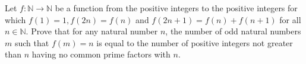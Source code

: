 Let $ f: \mathbb{N} \rightarrow \mathbb{N} $ be a function from the positive integers to the positive integers for which $ f(1)=1,f(2n)=f(n) $ and $ f(2n+1)=f(n)+f(n+1) $ for all $ n\in \mathbb{N} $. Prove that for any natural number $ n $,  the number of odd natural numbers $ m $ such that $ f(m)=n $ is equal to the number of positive integers not greater than $ n $ having no common prime factors with $ n $.